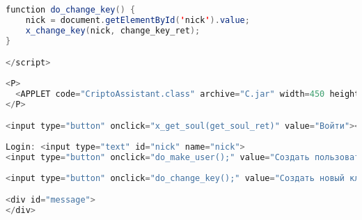 {\begin{lstlisting}[language=Java]
function do_change_key() {
	nick = document.getElementById('nick').value;
	x_change_key(nick, change_key_ret);
}

</script>  
  
<P>
  <APPLET code="CriptoAssistant.class" archive="C.jar" width=450 height=200></APPLET>
</P>

<input type="button" onclick="x_get_soul(get_soul_ret)" value="Войти"><br><br>
   
Login: <input type="text" id="nick" name="nick">
<input type="button" onclick="do_make_user();" value="Создать пользователя">
   
<input type="button" onclick="do_change_key();" value="Создать новый ключ"><br><br>

<div id="message">
</div>

\end{lstlisting}}


